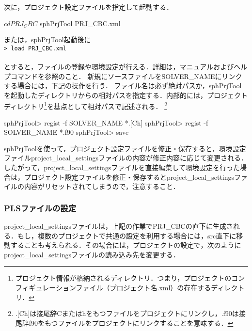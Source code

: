 \noindent 次に，プロジェクト設定ファイルを指定して起動する．
{\small
\begin{program}
$ cd PRJ_CBC
$ sphPrjTool PRJ_CBC.xml  
\end{program}
}
\noindent または，sphPrjTool起動後に\\

{\small
\noindent \verb|> load PRJ_CBC.xml|\\
\\
}
\noindent とすると，ファイルの登録や環境設定が行える．詳細は，マニュアルおよびヘルプコマンドを参照のこと．
新規にソースファイルをSOLVER\_NAMEにリンクする場合には，下記の操作を行う．
ファイル名は必ず絶対パスか，sphPrjToolを起動したディレクトリからの相対パスを指定する．内部的には，プロジェクトディレクトリ\footnote{プロジェクト情報が格納されるディレクトリ．つまり，プロジェクトのコンフィギュレーションファイル（プロジェクト名.xml）の存在するディレクトリ．}を基点として相対パスで記述される．
\footnote{.[Ch]は接尾辞Cまたはhをもつファイルをプロジェクトにリンクし，.f90は接尾辞f90をもつファイルをプロジェクトにリンクすることを意味する．}
{\small
\begin{program}
sphPrjTool> regist -f SOLVER_NAME *.[Ch]
sphPrjTool> regist -f SOLVER_NAME *.f90
sphPrjTool> save
\end{program}
}
sphPrjToolを使って，プロジェクト設定ファイルを修正・保存すると，環境設定ファイルproject\_local\_settingsファイルの内容が修正内容に応じて変更される．したがって，project\_local\_settingsファイルを直接編集して環境設定を行った場合は，プロジェクト設定ファイルを修正・保存するとproject\_local\_settingsファイルの内容がリセットされてしまうので，注意すること．

%
\subsubsection{PLSファイルの設定}
project\_local\_settingsファイルは，上記の作業でPRJ\_CBCの直下に生成される．もし，複数のプロジェクトで共通の設定を利用する場合には，src直下に移動することも考えられる．その場合には，プロジェクトの設定で，次のようにproject\_local\_settingsファイルの読み込み先を変更する．

{\small
{}
}

